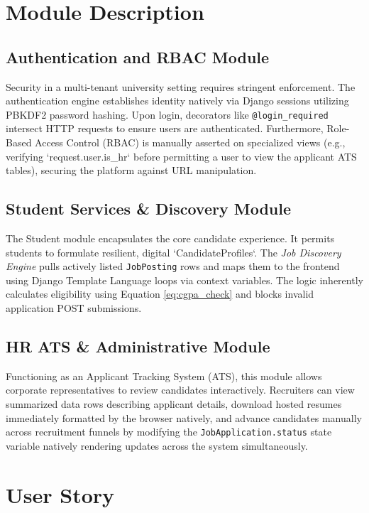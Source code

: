 \documentclass[a4paper,12pt]{report}
\begin{document}
\section{Module Description}

\subsection{Authentication and RBAC Module}
Security in a multi-tenant university setting requires stringent enforcement. The authentication engine establishes identity natively via Django sessions utilizing PBKDF2 password hashing. Upon login, decorators like \texttt{@login\_required} intersect HTTP requests to ensure users are authenticated. Furthermore, Role-Based Access Control (RBAC) is manually asserted on specialized views (e.g., verifying `request.user.is\_hr` before permitting a user to view the applicant ATS tables), securing the platform against URL manipulation.

\subsection{Student Services \& Discovery Module}
The Student module encapsulates the core candidate experience. It permits students to formulate resilient, digital `CandidateProfiles`. The \textit{Job Discovery Engine} pulls actively listed \texttt{JobPosting} rows and maps them to the frontend using Django Template Language loops via context variables. The logic inherently calculates eligibility using Equation \ref{eq:cgpa_check} and blocks invalid application POST submissions.

\subsection{HR ATS \& Administrative Module}
Functioning as an Applicant Tracking System (ATS), this module allows corporate representatives to review candidates interactively. Recruiters can view summarized data rows describing applicant details, download hosted resumes immediately formatted by the browser natively, and advance candidates manually across recruitment funnels by modifying the \texttt{JobApplication.status} state variable natively rendering updates across the system simultaneously.


\section{User Story}
\end{document}
